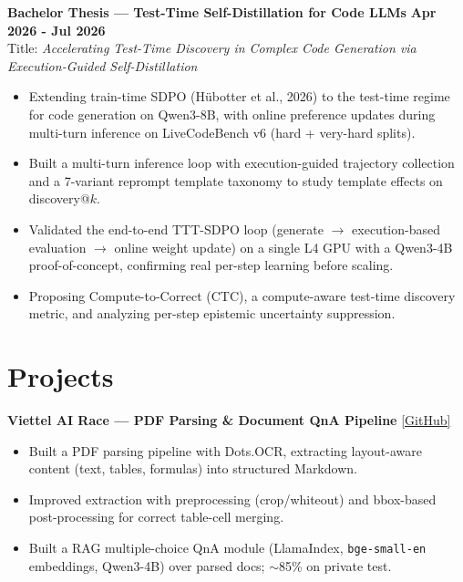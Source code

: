 \documentclass[a4paper,10pt]{article}
\begin{document}
\noindent\textbf{Bachelor Thesis --- Test-Time Self-Distillation for Code LLMs} \hfill \textbf{Apr 2026 - Jul 2026} \\
\quad Title: \textit{Accelerating Test-Time Discovery in Complex Code Generation via Execution-Guided Self-Distillation} \\
\vspace{-0.3em}
\begin{itemize}[leftmargin=1.2em, itemsep=0.05em, parsep=0pt, topsep=0pt]
    \item Extending train-time SDPO (Hübotter et al., 2026) to the test-time regime for code generation on Qwen3-8B, with online preference updates during multi-turn inference on LiveCodeBench v6 (hard + very-hard splits).
    \item Built a multi-turn inference loop with execution-guided trajectory collection and a 7-variant reprompt template taxonomy to study template effects on discovery@$k$.
    \item Validated the end-to-end TTT-SDPO loop (generate $\rightarrow$ execution-based evaluation $\rightarrow$ online weight update) on a single L4 GPU with a Qwen3-4B proof-of-concept, confirming real per-step learning before scaling.
    \item Proposing Compute-to-Correct (CTC), a compute-aware test-time discovery metric, and analyzing per-step epistemic uncertainty suppression.
\end{itemize}

\section{Projects}

\noindent\textbf{Viettel AI Race --- PDF Parsing \& Document QnA Pipeline} \hfill \href{https://github.com/theAbyssOfTime2004/Viettel-AI-Race}{\color{darkblue}[GitHub]} \\
\vspace{-1.1em}
\begin{itemize}[leftmargin=1.2em, itemsep=0.05em, parsep=0pt]
  \item Built a PDF parsing pipeline with Dots.OCR, extracting layout-aware content (text, tables, formulas) into structured Markdown.
  \item Improved extraction with preprocessing (crop/whiteout) and bbox-based post-processing for correct table-cell merging.
  \item Built a RAG multiple-choice QnA module (LlamaIndex, \texttt{bge-small-en} embeddings, Qwen3-4B) over parsed docs; $\sim$85\% on private test.
\end{itemize}
\end{document}
